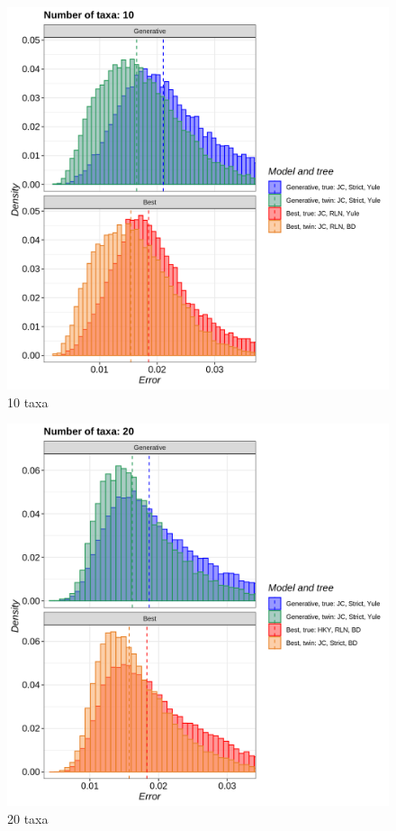 \begin{figure}[H]
  \includegraphics[width=\textwidth]{pirouette_example_20/errors_10.png}
  \caption{10 taxa}
\end{figure}

\begin{figure}[H]
  \includegraphics[width=\textwidth]{pirouette_example_20/errors_20.png}
  \caption{20 taxa}
\end{figure}

